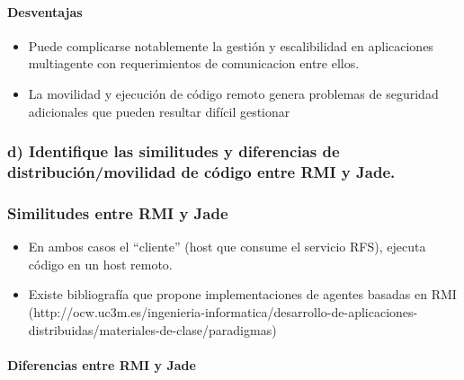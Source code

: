 \documentclass[11pt]{extarticle}
\begin{document}
\hypertarget{desventajas}{%
\paragraph{Desventajas}\label{desventajas}}

\begin{itemize}
\item
  Puede complicarse notablemente la gestión y escalibilidad en
  aplicaciones multiagente con requerimientos de comunicacion entre
  ellos.
\item
  La movilidad y ejecución de código remoto genera problemas de
  seguridad adicionales que pueden resultar difícil gestionar
\end{itemize}

    \hypertarget{d-identifique-las-similitudes-y-diferencias-de-distribuciuxf3nmovilidad-de-cuxf3digo-entre-rmi-y-jade.}{%
\subsubsection{d) Identifique las similitudes y diferencias de
distribución/movilidad de código entre RMI y
Jade.}\label{d-identifique-las-similitudes-y-diferencias-de-distribuciuxf3nmovilidad-de-cuxf3digo-entre-rmi-y-jade.}}

    \hypertarget{similitudes-entre-rmi-y-jade}{%
\subsubsection{Similitudes entre RMI y
Jade}\label{similitudes-entre-rmi-y-jade}}

\begin{itemize}
\item
  En ambos casos el ``cliente'' (host que consume el servicio RFS),
  ejecuta código en un host remoto.
\item
  Existe bibliografía que propone implementaciones de agentes basadas en
  RMI
  (http://ocw.uc3m.es/ingenieria-informatica/desarrollo-de-aplicaciones-distribuidas/materiales-de-clase/paradigmas)
\end{itemize}

\hypertarget{diferencias-entre-rmi-y-jade}{%
\paragraph{Diferencias entre RMI y
Jade}\label{diferencias-entre-rmi-y-jade}}
\end{document}
